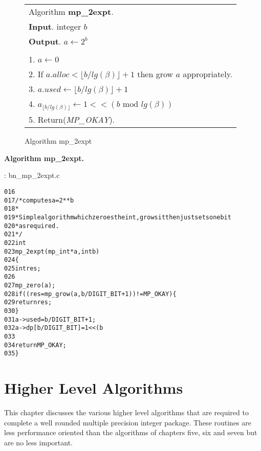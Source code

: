 \documentclass[b5paper]{book}
\begin{document}
\begin{figure}[!here]
\begin{small}
\begin{center}
\begin{tabular}{l}
\hline Algorithm \textbf{mp\_2expt}. \\
\textbf{Input}.   integer $b$ \\
\textbf{Output}.  $a \leftarrow 2^b$ \\
\hline \\
1.  $a \leftarrow 0$ \\
2.  If $a.alloc < \lfloor b / lg(\beta) \rfloor + 1$ then grow $a$ appropriately. \\
3.  $a.used \leftarrow \lfloor b / lg(\beta) \rfloor + 1$ \\
4.  $a_{\lfloor b / lg(\beta) \rfloor} \leftarrow 1 << (b \mbox{ mod } lg(\beta))$ \\
5.  Return(\textit{MP\_OKAY}). \\
\hline
\end{tabular}
\end{center}
\end{small}
\caption{Algorithm mp\_2expt}
\end{figure}

\textbf{Algorithm mp\_2expt.}

\vspace{+3mm}\begin{small}
\hspace{-5.1mm}{\bf File}: bn\_mp\_2expt.c
\vspace{-3mm}
\begin{alltt}
016   
017   /* computes a = 2**b 
018    *
019    * Simple algorithm which zeroes the int, grows it then just sets one bit
020    * as required.
021    */
022   int
023   mp_2expt (mp_int * a, int b)
024   \{
025     int     res;
026   
027     mp_zero (a);
028     if ((res = mp_grow (a, b / DIGIT_BIT + 1)) != MP_OKAY) \{
029       return res;
030     \}
031     a->used = b / DIGIT_BIT + 1;
032     a->dp[b / DIGIT_BIT] = 1 << (b % DIGIT_BIT);
033   
034     return MP_OKAY;
035   \}
\end{alltt}
\end{small}

\chapter{Higher Level Algorithms}

This chapter discusses the various higher level algorithms that are required to complete a well rounded multiple precision integer package.  These
routines are less performance oriented than the algorithms of chapters five, six and seven but are no less important.  
\end{document}
